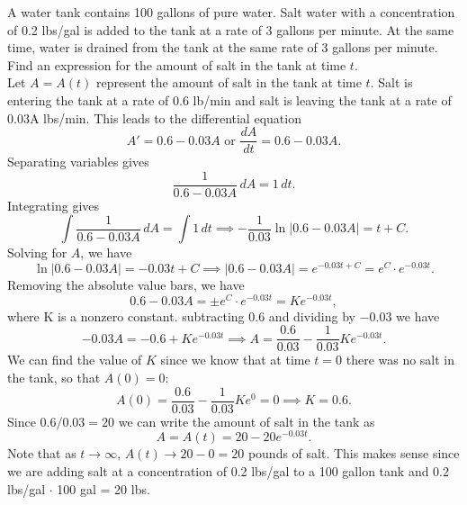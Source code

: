 \documentclass{ximera}
\begin{document}
\begin{example}[example 6]
A water tank contains 100 gallons of pure water. Salt water with a concentration of 0.2 lbs/gal is added to the tank at a rate of 3 gallons per minute.
At the same time, water is drained from the tank at the same rate of 3 gallons per minute.
Find an expression for the amount of salt in the tank at time $t$.\\
Let $A = A(t)$ represent the amount of salt in the tank at time $t$. Salt is entering the tank at a rate of 0.6 lb/min and 
salt is leaving the tank at a rate of 0.03A lbs/min. This leads to the differential equation
\[
A' = 0.6 - 0.03A \text{  or  } \frac{dA}{dt} = 0.6 - 0.03A.
\]
Separating variables gives
\[
\frac{1}{0.6 -0.03A} \, dA = 1\, dt.
\]
Integrating gives
\[
\int \frac{1}{0.6 -0.03A} \, dA = \int 1 \, dt \implies -\frac{1}{0.03}\ln|0.6 - 0.03A|  = t + C.
\]
Solving for $A$, we have
\[
\ln|0.6 - 0.03A|  = -0.03t + C \implies |0.6-0.03A| = e^{-0.03t + C} = e^C \cdot e^{-0.03t}.
\]
Removing the absolute value bars, we have
\[
0.6 - 0.03A = \pm e^C \cdot e^{-0.03t} = Ke^{-0.03t},
\]
where K is a nonzero constant.
subtracting $0.6$ and dividing by $-0.03$ we have 
\[
-0.03A = -0.6 + Ke^{-0.03t} \implies A = \frac{0.6}{0.03} - \frac{1}{0.03}Ke^{-0.03t}.
\]
We can find the value of $K$ since we know that at time $t = 0$ there was no salt in the tank, so that $A(0) = 0$:
\[
A(0) = \frac{0.6}{0.03} - \frac{1}{0.03}Ke^0 = 0 \implies  K = 0.6.
\]
Since $0.6/0.03 = 20$ we can write the amount of salt in the tank as
\[
A= A(t) = 20 - 20e^{-0.03t}.
\]
Note that as $t\to \infty$, $A(t) \to 20 - 0 = 20$ pounds of salt. 
This makes sense since we are adding salt at a concentration of 0.2 lbs/gal to a 100 gallon tank and 0.2 lbs/gal $\cdot$ 100 gal = 20 lbs.
\end{example}
\end{document}
